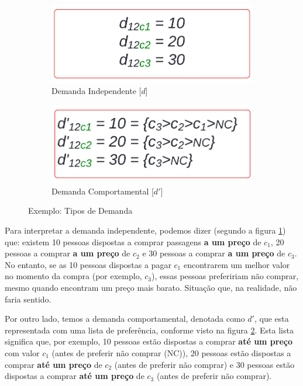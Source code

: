 \begin{figure}[h!]
	\centering
	\begin{subfigure}[b]{0.40\linewidth}
		\includegraphics[width=\linewidth]{img/dem_indepen.png}
		\caption{Demanda Independente [$d$]}
		\label{fig:dem_indepen}
	\end{subfigure}\hspace{5mm}
	\begin{subfigure}[b]{0.40\linewidth}
		\includegraphics[width=\linewidth]{img/dem_compo.png}
		\caption{Demanda Comportamental [$d'$]}
		\label{fig:dem_comporta}
	\end{subfigure}
	\caption{Exemplo: Tipos de Demanda}
	\label{fig: tipos_demanda}
\end{figure}


Para interpretar a demanda independente, podemos dizer (segundo a figura \ref{fig:dem_indepen}) que: existem 10 pessoas dispostas a comprar passagens \textbf{a um preço} de $c_1$, 20 pessoas a comprar \textbf{a um preço} de $c_2$ e 30 pessoas a comprar \textbf{a um preço} de $c_3$. No entanto, se as 10 pessoas dispostas a pagar $c_1$ encontrarem um melhor valor no momento da compra (por exemplo, $c_3$), essas pessoas prefeririam não comprar, mesmo quando encontram um preço mais barato. Situação que, na realidade, não faria sentido.

Por outro lado, temos a demanda comportamental, denotada como $d'$, que esta representada com uma lista de preferência, conforme visto na figura \ref{fig:dem_comporta}. Esta lista significa que, por exemplo, 10 pessoas estão dispostas a comprar \textbf{até um preço} com valor $c_1$ (antes de preferir não comprar (NC)), 20 pessoas estão dispostas a comprar \textbf{até um preço} de $c_2$  (antes de preferir não comprar) e 30 pessoas estão dispostas a comprar \textbf{até um preço} de $c_3$  (antes de preferir não comprar).


